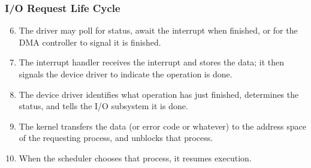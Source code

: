 \begin{frame}
\frametitle{I/O Request Life Cycle}

\begin{enumerate}
	\setcounter{enumi}{5}
	\item The driver may poll for status, await the interrupt when finished, or for the DMA controller to signal it is finished.
	\item The interrupt handler receives the interrupt and stores the data; it then signals the device driver to indicate the operation is done.
	\item The device driver identifies what operation has just finished, determines the status, and tells the I/O subsystem it is done.
	\item The kernel transfers the data (or error code or whatever) to the address space of the requesting process, and unblocks that process.
	\item When the scheduler chooses that process, it resumes execution.
\end{enumerate}


\end{frame}



